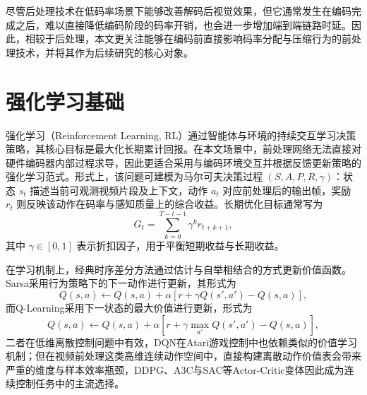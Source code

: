 尽管后处理技术在低码率场景下能够改善解码后视觉效果，但它通常发生在编码完成之后，难以直接降低编码阶段的码率开销，也会进一步增加端到端链路时延。因此，相较于后处理，本文更关注能够在编码前直接影响码率分配与压缩行为的前处理技术，并将其作为后续研究的核心对象。

\section{强化学习基础}

强化学习（Reinforcement Learning, RL）\cite{ref41-sutton2018rl}通过智能体与环境的持续交互学习决策策略，其核心目标是最大化长期累计回报。在本文场景中，前处理网络无法直接对硬件编码器内部过程求导，因此更适合采用与编码环境交互并根据反馈更新策略的强化学习范式。形式上，该问题可建模为马尔可夫决策过程 $(S,A,P,R,\gamma)$：状态 $s_t$ 描述当前可观测视频片段及上下文，动作 $a_t$ 对应前处理后的输出帧，奖励 $r_t$ 则反映该动作在码率与感知质量上的综合收益。长期优化目标通常写为
\begin{equation}
G_t = \sum_{k=0}^{T-t-1} \gamma^k r_{t+k+1},
\label{eq:rl-return}
\end{equation}
其中 $\gamma\in[0,1]$ 表示折扣因子，用于平衡短期收益与长期收益。

在学习机制上，经典时序差分方法通过估计与自举相结合的方式更新价值函数。Sarsa采用行为策略下的下一动作进行更新，其形式为
\begin{equation}
  Q(s,a) \leftarrow Q(s,a) + \alpha \left[ r + \gamma Q(s',a') - Q(s,a) \right],
  \label{eq:sarsa}
\end{equation}
而Q-Learning采用下一状态的最大价值进行更新，形式为
\begin{equation}
  Q(s,a) \leftarrow Q(s,a) + \alpha \left[ r + \gamma \max_{a'} Q(s',a') - Q(s,a) \right],
  \label{eq:qlearning}
\end{equation}
二者在低维离散控制问题中有效，DQN\cite{ref36-mnih2015dqn}在Atari游戏控制中也依赖类似的价值学习机制；但在视频前处理这类高维连续动作空间中，直接构建离散动作价值表会带来严重的维度与样本效率瓶颈，DDPG\cite{ref37-lillicrap2016ddpg}、A3C\cite{ref39-mnih2016a3c}与SAC\cite{ref38-haarnoja2018sac}等Actor-Critic变体因此成为连续控制任务中的主流选择。

